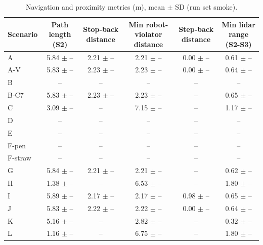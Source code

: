 \begin{table}[t]\centering\small
\caption{Navigation and proximity metrics (m), mean $\pm$ SD (run set smoke).}
\begin{tabular}{lccccc}
\toprule
Scenario & Path length (S2) & Stop-back distance & Min robot-violator distance & Step-back distance & Min lidar range (S2-S3) \\
\midrule
A & 5.84 $\pm$ – & 2.21 $\pm$ – & 2.21 $\pm$ – & 0.00 $\pm$ – & 0.61 $\pm$ – \\
A-V & 5.83 $\pm$ – & 2.23 $\pm$ – & 2.23 $\pm$ – & 0.00 $\pm$ – & 0.64 $\pm$ – \\
B & -- & -- & -- & -- & -- \\
B-C7 & 5.83 $\pm$ – & 2.23 $\pm$ – & 2.23 $\pm$ – & -- & 0.65 $\pm$ – \\
C & 3.09 $\pm$ – & -- & 7.15 $\pm$ – & -- & 1.17 $\pm$ – \\
D & -- & -- & -- & -- & -- \\
E & -- & -- & -- & -- & -- \\
F-pen & -- & -- & -- & -- & -- \\
F-straw & -- & -- & -- & -- & -- \\
G & 5.84 $\pm$ – & 2.21 $\pm$ – & 2.21 $\pm$ – & -- & 0.62 $\pm$ – \\
H & 1.38 $\pm$ – & -- & 6.53 $\pm$ – & -- & 1.80 $\pm$ – \\
I & 5.89 $\pm$ – & 2.17 $\pm$ – & 2.17 $\pm$ – & 0.98 $\pm$ – & 0.65 $\pm$ – \\
J & 5.83 $\pm$ – & 2.22 $\pm$ – & 2.22 $\pm$ – & 0.00 $\pm$ – & 0.64 $\pm$ – \\
K & 5.16 $\pm$ – & -- & 2.82 $\pm$ – & -- & 0.32 $\pm$ – \\
L & 1.16 $\pm$ – & -- & 6.75 $\pm$ – & -- & 1.80 $\pm$ – \\
\bottomrule
\end{tabular}
\end{table}
